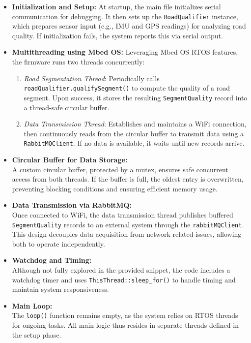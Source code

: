 \begin{itemize}
    \item \textbf{Initialization and Setup:}  
    At startup, the main file initializes serial communication for debugging. It then sets up the \texttt{RoadQualifier} instance, which prepares sensor input (e.g., IMU and GPS readings) for analyzing road quality. If initialization fails, the system reports this via serial output.

    \item \textbf{Multithreading using Mbed OS:}  
    Leveraging Mbed OS RTOS features, the firmware runs two threads concurrently:
    \begin{enumerate}
        \item \textit{Road Segmentation Thread}: Periodically calls \texttt{roadQualifier.qualifySegment()} to compute the quality of a road segment. Upon success, it stores the resulting \texttt{SegmentQuality} record into a thread-safe circular buffer.
        \item \textit{Data Transmission Thread}: Establishes and maintains a WiFi connection, then continuously reads from the circular buffer to transmit data using a \texttt{RabbitMQClient}. If no data is available, it waits until new records arrive.
    \end{enumerate}

    \item \textbf{Circular Buffer for Data Storage:}  \\
    A custom circular buffer, protected by a mutex, ensures safe concurrent access from both threads. If the buffer is full, the oldest entry is overwritten, preventing blocking conditions and ensuring efficient memory usage.

    \item \textbf{Data Transmission via RabbitMQ:}  \\
    Once connected to WiFi, the data transmission thread publishes buffered \texttt{SegmentQuality} records to an external system through the \texttt{rabbitMQClient}. This design decouples data acquisition from network-related issues, allowing both to operate independently.

    \item \textbf{Watchdog and Timing:}  \\
    Although not fully explored in the provided snippet, the code includes a watchdog timer and uses \texttt{ThisThread::sleep\_for()} to handle timing and maintain system responsiveness.

    \item \textbf{Main Loop:}  \\
    The \texttt{loop()} function remains empty, as the system relies on RTOS threads for ongoing tasks. All main logic thus resides in separate threads defined in the setup phase.
\end{itemize}

